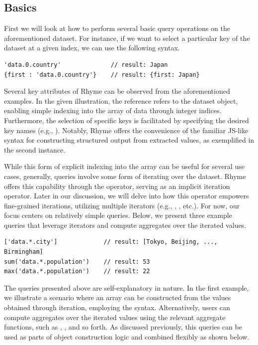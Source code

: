 \documentclass[runningheads]{llncs}
\newcommand{\lang}{Rhyme}
\begin{document}
\subsection{Basics}
First we will look at how to perform several basic query operations on the
aforementioned dataset.
For instance, if we want to select a particular key of the dataset at a given
index, we can use the following syntax.

\begin{lstlisting}[style=JavaScript]
'data.0.country'              // result: Japan
{first : 'data.0.country'}    // result: {first: Japan}
\end{lstlisting}

Several key attributes of \lang{} can be observed from the aforementioned examples.
In the given illustration, the reference  refers to
the dataset object, enabling simple indexing into the array of data through integer
indices.
Furthermore, the selection of specific keys is facilitated by specifying the desired
key names (e.g., ).
Notably, \lang{} offers the convenience of the familiar JS-like syntax for constructing
structured output from extracted values, as exemplified in the second instance.

While this form of explicit indexing into the array can be useful for several
use cases, generally, queries involve some form of iterating over the dataset.
\lang{} offers this capability through the \inline{*} operator,
serving as an implicit iteration operator.
Later in our discussion, we will delve into how this operator empowers fine-grained
iterations, utilizing multiple iterators
(e.g., , , etc.).
For now, our focus centers on relatively simple queries.
Below, we present three example queries that leverage iterators and compute
aggregates over the iterated values.

\begin{lstlisting}[style=JavaScript, columns=flexible]
['data.*.city']             // result: [Tokyo, Beijing, ..., Birmingham]
sum('data.*.population')    // result: 53
max('data.*.population')    // result: 22
\end{lstlisting}

The queries presented above are self-explanatory in nature.
In the first example, we illustrate a scenario where an array can be constructed
from the values obtained through iteration, employing the \inline{[...]} syntax.
Alternatively, users can compute aggregates over the iterated values using the
relevant aggregate functions, such as , , and so forth.
As discussed previously, this queries can be used as parts of object
construction logic and combined flexibly as shown below.
\end{document}
